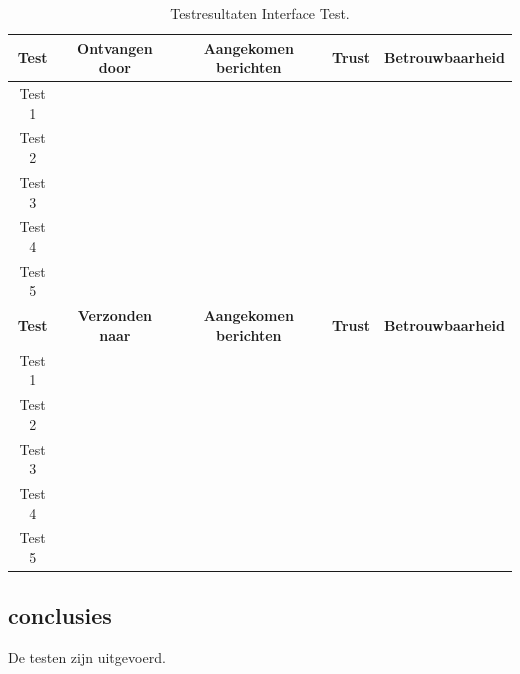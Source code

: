 \begin{table}[h]
    \centering
    \begin{tabular}{|c||c|c|c|c|}
        \textbf{Test}   &   \textbf{Ontvangen door} & \textbf{Aangekomen berichten} &   \textbf{Trust}  &   \textbf{Betrouwbaarheid}    \\\hline
        Test 1          &                           &                               &                   &                               \\\hline 
        Test 2          &                           &                               &                   &                               \\\hline 
        Test 3          &                           &                               &                   &                               \\\hline 
        Test 4          &                           &                               &                   &                               \\\hline 
        Test 5          &                           &                               &                   &                               \\\hline 
        \textbf{Test}   &   \textbf{Verzonden naar} & \textbf{Aangekomen berichten} &   \textbf{Trust}  &   \textbf{Betrouwbaarheid}    \\\hline
        Test 1          &                           &                               &                   &                               \\\hline 
        Test 2          &                           &                               &                   &                               \\\hline 
        Test 3          &                           &                               &                   &                               \\\hline 
        Test 4          &                           &                               &                   &                               \\\hline 
        Test 5          &                           &                               &                   &                               \\\hline 
    \end{tabular}
    \caption{Testresultaten Interface Test.}
    \label{tab:Int}
\end{table}

\subsection{conclusies}
De testen zijn uitgevoerd. 

